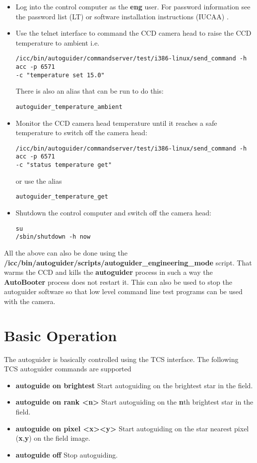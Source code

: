 \documentclass[10pt,a4paper]{article}
\begin{document}
\begin{itemize}
\item Log into the control computer as the {\bf eng} user. For password information see the password list (LT) or software installation instructions (IUCAA) \cite{bib:iucaainstallation}.
\item Use the telnet interface to command the CCD camera head to raise the CCD temperature to ambient i.e.
\begin{verbatim}
/icc/bin/autoguider/commandserver/test/i386-linux/send_command -h acc -p 6571 
-c "temperature set 15.0"
\end{verbatim} 
There is also an alias that can be run to do this:
\begin{verbatim}
autoguider_temperature_ambient
\end{verbatim}
\item Monitor the CCD camera head temperature until it reaches a safe temperature to switch off the camera head:
\begin{verbatim}
/icc/bin/autoguider/commandserver/test/i386-linux/send_command -h acc -p 6571 
-c "status temperature get"
\end{verbatim}
or use the alias 
\begin{verbatim}
autoguider_temperature_get
\end{verbatim}
\item Shutdown the control computer and switch off the camera head:
\begin{verbatim}
su
/sbin/shutdown -h now
\end{verbatim}
\end{itemize}

All the above can also be done using the {\bf /icc/bin/autoguider/scripts/autoguider\_engineering\_mode} script. That
warms the CCD and kills the {\bf autoguider} process in such a way the {\bf AutoBooter} process does not restart it. This can also be used to stop the autoguider software so that low level command line test programs can be used with the camera.

\section{Basic Operation}

The autoguider is basically controlled using the TCS interface. The following TCS autoguider commands are supported
\begin{itemize}
\item {\bf autoguide on brightest} Start autoguiding on the brightest star in the field.
\item {\bf autoguide on rank \textless n\textgreater} Start autoguiding on the {\bf n}th brightest star in the field.
\item {\bf autoguide on pixel \textless x\textgreater \textless y\textgreater} Start autoguiding on the  star nearest pixel ({\bf x},{\bf y}) on the field image.
\item {\bf autoguide off} Stop autoguiding.
\end{itemize}
\end{document}
